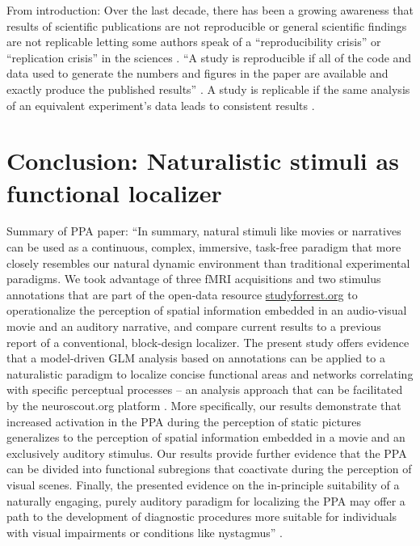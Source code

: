 From introduction:
Over the last decade, there has been a growing awareness that results of
scientific publications are not reproducible or general scientific findings are
not replicable letting some authors speak of a ``reproducibility crisis'' or
``replication crisis'' in the sciences \citep{baker2016reproducibility,
plesser2018reproducibility, stupple2019reproducibility, nosek2022replicability}.
``A study is reproducible if all of the code and data used to generate the
numbers and figures in the paper are available and exactly produce the published
results'' \citep{leek2017most}.
A study is replicable if the same analysis of an equivalent experiment's data
leads to consistent results \citep{dubois2016building, leek2017most}.


\section{Conclusion: Naturalistic stimuli as functional localizer}

Summary of PPA paper:
``In summary, natural stimuli like movies \citep{eickhoff2020towards,
hasson2008neurocinematics, sonkusare2019naturalistic} or narratives
\citep{hamilton2018revolution, honey2012not, lerner2011topographic,
silbert2014coupled, wilson2008beyond} can be used as a continuous, complex,
immersive, task-free paradigm that more closely resembles our natural dynamic
environment than traditional experimental paradigms.
We took advantage of three fMRI acquisitions and two stimulus annotations that
are part of the open-data resource
\href{http://www.studyforrest.org}{studyforrest.org} to operationalize the
perception of spatial information embedded in an audio-visual movie and an
auditory narrative, and compare current results to a previous report of a
conventional, block-design localizer.
The present study offers evidence that a model-driven GLM analysis based on
annotations can be applied to a naturalistic paradigm to localize concise
functional areas and networks correlating with specific perceptual processes --
an analysis approach that can be facilitated by the neuroscout.org platform
\citep{delavega2021neuroscout}.
More specifically, our results demonstrate that increased activation in the PPA
during the perception of static pictures generalizes to the perception of
spatial information embedded in a movie and an exclusively auditory stimulus.
Our results provide further evidence that the PPA can be divided into functional
subregions that coactivate during the perception of visual scenes.
Finally, the presented evidence on the in-principle suitability of a naturally
engaging, purely auditory paradigm for localizing the PPA may offer a path to
the development of diagnostic procedures more suitable for individuals with
visual impairments or conditions like nystagmus''
\citep{haeusler2022processing}.

